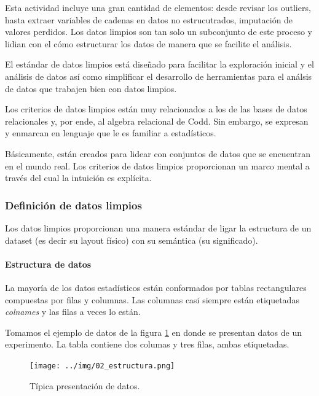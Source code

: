 \documentclass[]{article}
\let\oldparagraph\paragraph
\renewcommand{\paragraph}[1]{\oldparagraph{#1}\mbox{}}
\begin{document}
Esta actividad incluye una gran cantidad de elementos: desde revisar los
outliers, hasta extraer variables de cadenas en datos no estrucutrados,
imputación de valores perdidos. Los datos limpios son tan solo un
subconjunto de este proceso y lidian con el cómo estructurar los datos
de manera que se facilite el análisis.

El estándar de datos limpios está diseñado para facilitar la exploración
inicial y el análisis de datos así como simplificar el desarrollo de
herramientas para el análsis de datos que trabajen bien con datos
limpios.

Los criterios de datos limpios están muy relacionados a los de las bases
de datos relacionales y, por ende, al algebra relacional de Codd. Sin
embargo, se expresan y enmarcan en lenguaje que le es familiar a
estadísticos.

Básicamente, están creados para lidear con conjuntos de datos que se
encuentran en el mundo real. Los criterios de datos limpios proporcionan
un marco mental a través del cual la intuición es explícita.

\subsubsection{Definición de datos
limpios}\label{definicion-de-datos-limpios}

Los datos limpios proporcionan una manera estándar de ligar la
estructura de un dataset (es decir su layout físico) con su semántica
(su significado).

\paragraph{Estructura de datos}\label{estructura-de-datos}

La mayoría de los datos estadísticos están conformados por tablas
rectangulares compuestas por filas y columnas. Las columnas casi siempre
están etiquetadas \emph{colnames} y las filas a veces lo están.

Tomamos el ejemplo de datos de la figura \ref{fig:estructura} en donde
se presentan datos de un experimento. La tabla contiene dos columas y
tres filas, ambas etiquetadas.

\begin{figure}[h]
    \centering
    \texttt{[image: ../img/02\_estructura.png]}
    \caption{Típica presentación de datos.}
    \label{fig:estructura}
\end{figure}
\end{document}
